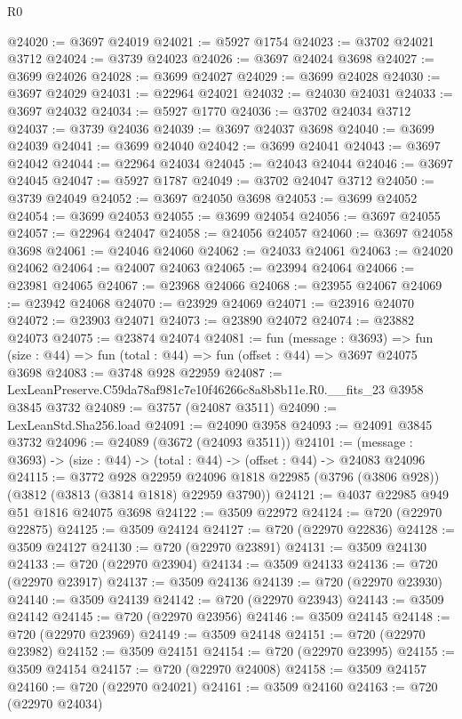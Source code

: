 \begin{lexlean}{R0}
\begin{coremodule}
@24020 := @3697 @24019
@24021 := @5927 @1754
@24023 := @3702 @24021 @3712
@24024 := @3739 @24023
@24026 := @3697 @24024 @3698
@24027 := @3699 @24026
@24028 := @3699 @24027
@24029 := @3699 @24028
@24030 := @3697 @24029
@24031 := @22964 @24021
@24032 := @24030 @24031
@24033 := @3697 @24032
@24034 := @5927 @1770
@24036 := @3702 @24034 @3712
@24037 := @3739 @24036
@24039 := @3697 @24037 @3698
@24040 := @3699 @24039
@24041 := @3699 @24040
@24042 := @3699 @24041
@24043 := @3697 @24042
@24044 := @22964 @24034
@24045 := @24043 @24044
@24046 := @3697 @24045
@24047 := @5927 @1787
@24049 := @3702 @24047 @3712
@24050 := @3739 @24049
@24052 := @3697 @24050 @3698
@24053 := @3699 @24052
@24054 := @3699 @24053
@24055 := @3699 @24054
@24056 := @3697 @24055
@24057 := @22964 @24047
@24058 := @24056 @24057
@24060 := @3697 @24058 @3698
@24061 := @24046 @24060
@24062 := @24033 @24061
@24063 := @24020 @24062
@24064 := @24007 @24063
@24065 := @23994 @24064
@24066 := @23981 @24065
@24067 := @23968 @24066
@24068 := @23955 @24067
@24069 := @23942 @24068
@24070 := @23929 @24069
@24071 := @23916 @24070
@24072 := @23903 @24071
@24073 := @23890 @24072
@24074 := @23882 @24073
@24075 := @23874 @24074
@24081 := fun (message : @3693) =>
  fun (size : @44) => fun (total : @44) => fun (offset : @44) => @3697 @24075 @3698
@24083 := @3748 @928 @22959
@24087 := LexLeanPreserve.C59da78af981c7e10f46266c8a8b8b11e.R0.__fits_23 @3958 @3845 @3732
@24089 := @3757 (@24087 @3511)
@24090 := LexLeanStd.Sha256.load
@24091 := @24090 @3958
@24093 := @24091 @3845 @3732
@24096 := @24089 (@3672 (@24093 @3511))
@24101 := (message : @3693) -> (size : @44) -> (total : @44) -> (offset : @44) -> @24083 @24096
@24115 := @3772
    @928
    @22959
    @24096
    @1818
    @22985
    (@3796 (@3806 @928))
    (@3812 (@3813 (@3814 @1818) @22959 @3790))
@24121 := @4037 @22985 @949 @51 @1816 @24075 @3698
@24122 := @3509 @22972
@24124 := @720 (@22970 @22875)
@24125 := @3509 @24124
@24127 := @720 (@22970 @22836)
@24128 := @3509 @24127
@24130 := @720 (@22970 @23891)
@24131 := @3509 @24130
@24133 := @720 (@22970 @23904)
@24134 := @3509 @24133
@24136 := @720 (@22970 @23917)
@24137 := @3509 @24136
@24139 := @720 (@22970 @23930)
@24140 := @3509 @24139
@24142 := @720 (@22970 @23943)
@24143 := @3509 @24142
@24145 := @720 (@22970 @23956)
@24146 := @3509 @24145
@24148 := @720 (@22970 @23969)
@24149 := @3509 @24148
@24151 := @720 (@22970 @23982)
@24152 := @3509 @24151
@24154 := @720 (@22970 @23995)
@24155 := @3509 @24154
@24157 := @720 (@22970 @24008)
@24158 := @3509 @24157
@24160 := @720 (@22970 @24021)
@24161 := @3509 @24160
@24163 := @720 (@22970 @24034)

\end{coremodule}
\end{lexlean}

